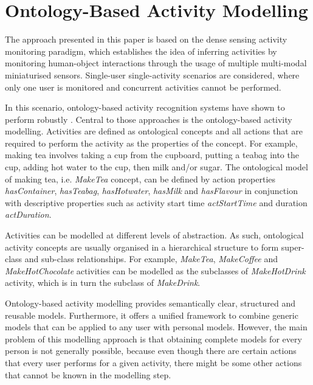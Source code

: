 \section{Ontology-Based Activity Modelling}
\label{sec:approach:ontology}

The approach presented in this paper is based on the dense sensing activity monitoring paradigm, which establishes the idea of inferring activities by monitoring human-object interactions through the usage of multiple multi-modal miniaturised sensors. Single-user single-activity scenarios are considered, where only one user is monitored and concurrent activities cannot be performed.

In this scenario, ontology-based activity recognition systems have shown to perform robustly \cite{Chen2012a}. Central to those approaches is the ontology-based activity modelling. Activities are defined as ontological concepts and all actions that are required to perform the activity as the properties of the concept. For example, making tea involves taking a cup from the cupboard, putting a teabag into the cup, adding hot water to the cup, then milk and/or sugar. The ontological model of making tea, i.e. \textit{MakeTea} concept, can be defined by action properties \textit{hasContainer}, \textit{hasTeabag}, \textit{hasHotwater}, \textit{hasMilk} and \textit{hasFlavour} in conjunction with descriptive properties such as activity start time \textit{actStartTime} and duration \textit{actDuration}.

Activities can be modelled at different levels of abstraction. As such, ontological activity concepts are usually organised in a hierarchical structure to form super-class and sub-class relationships. For example, \textit{MakeTea}, \textit{MakeCoffee} and \textit{MakeHotChocolate} activities can be modelled as the subclasses of \textit{MakeHotDrink} activity, which is in turn the subclass of \textit{MakeDrink}. 

Ontology-based activity modelling provides semantically clear, structured and reusable models. Furthermore, it offers a unified framework to combine generic models that can be applied to any user with personal models. However, the main problem of this modelling approach is that obtaining complete models for every person is not generally possible, because even though there are certain actions that every user performs for a given activity, there might be some other actions that cannot be known in the modelling step.